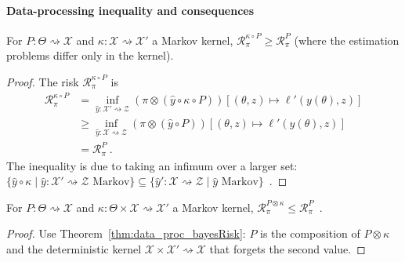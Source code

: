 \paragraph{Data-processing inequality and consequences}

\begin{theorem}
  \label{thm:data_proc_bayesRisk}
  \leanok
  For $P : \Theta \rightsquigarrow \mathcal X$ and $\kappa : \mathcal X \rightsquigarrow \mathcal X'$ a Markov kernel, $\mathcal R^{\kappa \circ P}_\pi \ge \mathcal R^{P}_\pi$ (where the estimation problems differ only in the kernel).
\end{theorem}

\begin{proof}\leanok
\uses{}
The risk $\mathcal R^{\kappa \circ P}_\pi$ is
\begin{align*}
\mathcal R^{\kappa \circ P}_\pi
&= \inf_{\hat{y} : \mathcal X' \rightsquigarrow \mathcal Z} (\pi \otimes (\hat{y} \circ \kappa \circ P))\left[(\theta, z) \mapsto \ell'(y(\theta), z)\right]
\\
&\ge \inf_{\hat{y} : \mathcal X \rightsquigarrow \mathcal Z} (\pi \otimes (\hat{y} \circ P))\left[(\theta, z) \mapsto \ell'(y(\theta), z)\right]
\\
&= \mathcal R^{P}_\pi
\: .
\end{align*}
The inequality is due to taking an infimum over a larger set: $\{\hat{y} \circ \kappa \mid \hat{y} : \mathcal X' \rightsquigarrow \mathcal Z \text{ Markov}\} \subseteq \{\hat{y}' : \mathcal X \rightsquigarrow \mathcal Z \mid \hat{y} \text{ Markov}\}$~.
\end{proof}

\begin{lemma}
  \label{lem:bayesRisk_compProd_le_fst}
  For $P : \Theta \rightsquigarrow \mathcal X$ and $\kappa : \Theta \times \mathcal X \rightsquigarrow \mathcal X'$ a Markov kernel, $\mathcal R^{P \otimes \kappa}_\pi \le \mathcal R^{P}_\pi$~.
\end{lemma}

\begin{proof}%
{}
Use Theorem~\ref{thm:data_proc_bayesRisk}: $P$ is the composition of $P \otimes \kappa$ and the deterministic kernel $\mathcal X \times \mathcal X' \rightsquigarrow \mathcal X$ that forgets the second value.
\end{proof}

